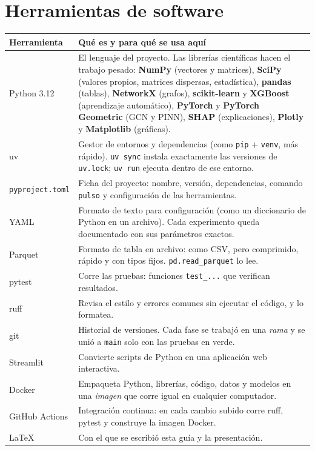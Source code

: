 \chapter{Herramientas de software}

\begin{longtable}{p{}p{}}
\toprule
\textbf{Herramienta} & \textbf{Qué es y para qué se usa aquí} \\
\midrule
\endhead
Python 3.12 & El lenguaje del proyecto. Las librerías científicas hacen el trabajo
pesado: \textbf{NumPy} (vectores y matrices), \textbf{SciPy} (valores propios, matrices
dispersas, estadística), \textbf{pandas} (tablas), \textbf{NetworkX} (grafos),
\textbf{scikit-learn} y \textbf{XGBoost} (aprendizaje automático), \textbf{PyTorch} y
\textbf{PyTorch Geometric} (GCN y PINN), \textbf{SHAP} (explicaciones),
\textbf{Plotly} y \textbf{Matplotlib} (gráficas). \\
uv & Gestor de entornos y dependencias (como \texttt{pip} + \texttt{venv}, más rápido).
\texttt{uv sync} instala exactamente las versiones de \texttt{uv.lock}; \texttt{uv run}
ejecuta dentro de ese entorno. \\
\texttt{pyproject.toml} & Ficha del proyecto: nombre, versión, dependencias, comando
\texttt{pulso} y configuración de las herramientas. \\
YAML & Formato de texto para configuración (como un diccionario de Python en un
archivo). Cada experimento queda documentado con sus parámetros exactos. \\
Parquet & Formato de tabla en archivo: como CSV, pero comprimido, rápido y con tipos
fijos. \texttt{pd.read\_parquet} lo lee. \\
pytest & Corre las pruebas: funciones \texttt{test\_...} que verifican resultados. \\
ruff & Revisa el estilo y errores comunes sin ejecutar el código, y lo formatea. \\
git & Historial de versiones. Cada fase se trabajó en una \emph{rama} y se unió a
\texttt{main} solo con las pruebas en verde. \\
Streamlit & Convierte scripts de Python en una aplicación web interactiva. \\
Docker & Empaqueta Python, librerías, código, datos y modelos en una \emph{imagen} que
corre igual en cualquier computador. \\
GitHub Actions & Integración continua: en cada cambio subido corre ruff, pytest y
construye la imagen Docker. \\
LaTeX & Con el que se escribió esta guía y la presentación. \\
\bottomrule
\end{longtable}

